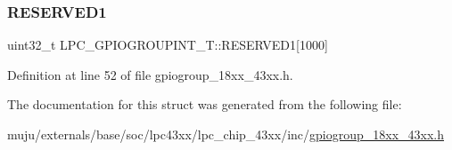 \subsubsection{\texorpdfstring{R\+E\+S\+E\+R\+V\+E\+D1}{RESERVED1}}
{\footnotesize\ttfamily uint32\+\_\+t L\+P\+C\+\_\+\+G\+P\+I\+O\+G\+R\+O\+U\+P\+I\+N\+T\+\_\+\+T\+::\+R\+E\+S\+E\+R\+V\+E\+D1\mbox{[}1000\mbox{]}}



Definition at line 52 of file gpiogroup\+\_\+18xx\+\_\+43xx.\+h.



The documentation for this struct was generated from the following file\+:\begin{DoxyCompactItemize}
\item 
muju/externals/base/soc/lpc43xx/lpc\+\_\+chip\+\_\+43xx/inc/\hyperlink{gpiogroup__18xx__43xx_8h}{gpiogroup\+\_\+18xx\+\_\+43xx.\+h}\end{DoxyCompactItemize}
